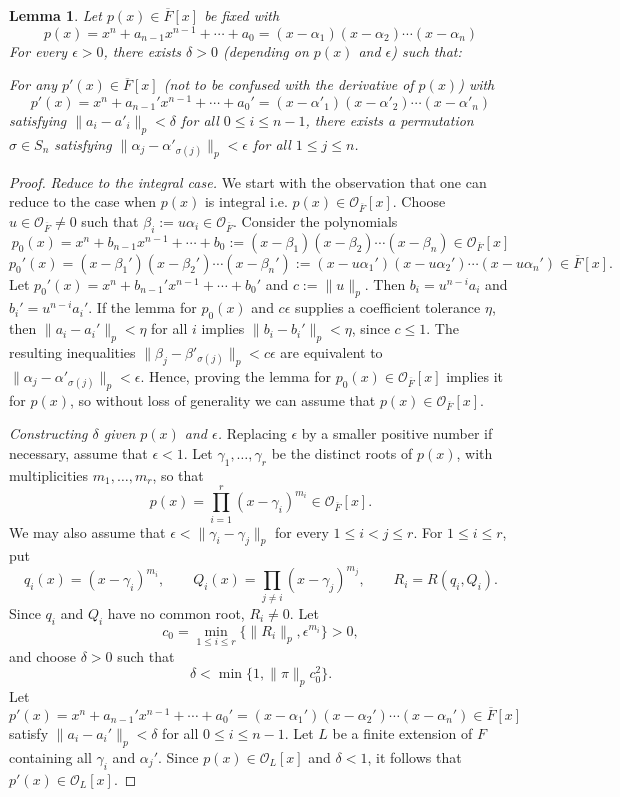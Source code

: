 \documentclass[11pt,a4paper]{article}
\theoremstyle{definition}
\theoremstyle{plain}
\newtheorem{Le}[shared]{Lemma}
\theoremstyle{remark}
\theoremstyle{plain}
\begin{document}
\begin{Le}\label{continuityofroots}
    Let $p(x) \in \overline{F}[x]$ be fixed with $$p(x) = x^n + a_{n-1}x^{n-1} + \cdots + a_0 = (x - \alpha_1)(x - \alpha_2) \cdots (x - \alpha_n)$$ For every $\epsilon > 0$, there exists $\delta > 0$ (depending on $p(x)$ and $\epsilon$) such that: 
    
    For any $p'(x) \in \overline{F}[x]$ (not to be confused with the derivative of $p(x)$) with $$p'(x) = x^n + a_{n-1}'x^{n-1}+ \cdots + a_0' = (x - \alpha'_1)(x - \alpha'_2) \cdots (x - \alpha'_n)$$  satisfying $\| a_i - a'_i \|_p < \delta$ for all $0 \leq  i \leq n-1$, there exists a permutation $\sigma \in S_n$ satisfying $\| \alpha_j - \alpha'_{\sigma(j)} \|_p < \epsilon$ for all $1 \leq j\leq n$.
\end{Le}
\begin{proof}

    \textit{Reduce to the integral case.} We start with the observation that one can reduce to the case when $p(x)$ is integral i.e. $p(x) \in \mathcal{O}_{\overline{F}}[x]$. Choose $u \in \mathcal{O}_{\overline{F}} \neq 0$ such that $\beta_i := u \alpha_i \in \mathcal{O}_{\overline{F}}$. Consider the polynomials $$p_0(x) = x^n + b_{n-1}x^{n-1} + \cdots + b_0 := (x - \beta_1)(x-\beta_2) \cdots (x-\beta_n) \in \mathcal{O}_{\overline{F}}[x]$$  $$p_0'(x) = (x - \beta_1')(x - \beta_2') \cdots (x - \beta_n') := (x - u \alpha_1')(x-u\alpha_2') \cdots (x-u\alpha_n') \in \overline{F}[x].$$
    Let $p_0'(x) = x^n + b_{n-1}' x^{n-1} + \cdots + b_0'$ and $c := \|u \|_p$. Then $b_i = u^{n-i}a_i$ and $b_i'=u^{n-i}a_i'$. If the lemma for $p_0(x)$ and $c\epsilon$ supplies a coefficient tolerance $\eta$, then $\|a_i-a_i'\|_p<\eta$ for all $i$ implies $\|b_i-b_i'\|_p<\eta$, since $c\leq 1$. The resulting inequalities $\|\beta_j-\beta'_{\sigma(j)}\|_p<c\epsilon$ are equivalent to $\|\alpha_j-\alpha'_{\sigma(j)}\|_p<\epsilon$. Hence, proving the lemma for $p_0(x) \in \mathcal{O}_{\overline{F}}[x]$ implies it for $p(x)$, so without loss of generality we can assume that $p(x) \in \mathcal{O}_{\overline{F}}[x]$.
    
    \textit{Constructing $\delta$ given $p(x)$ and $\epsilon$.} Replacing $\epsilon$ by a smaller positive number if necessary, assume that $\epsilon<1$. Let $\gamma_1,\ldots,\gamma_r$ be the distinct roots of $p(x)$, with multiplicities $m_1,\ldots,m_r$, so that $$p(x)=\prod_{i=1}^r(x-\gamma_i)^{m_i}\in\mathcal{O}_{\overline{F}}[x].$$ We may also assume that $\epsilon<\|\gamma_i-\gamma_j\|_p$ for every $1\leq i<j\leq r$. For $1\leq i\leq r$, put
    $$q_i(x)=(x-\gamma_i)^{m_i},\qquad Q_i(x)=\prod_{j\neq i}(x-\gamma_j)^{m_j},\qquad R_i=R(q_i,Q_i).$$
    Since $q_i$ and $Q_i$ have no common root, $R_i\neq0$. Let
    $$c_0=\min_{1\leq i\leq r}\{\|R_i\|_p,\epsilon^{m_i}\}>0,$$
    and choose $\delta>0$ such that
    $$\delta<\min\{1,\|\pi\|_p c_0^2\}.$$
    Let $$p'(x) = x^n + a_{n-1}'x^{n-1} + \cdots + a_0' = (x - \alpha_1')(x-\alpha_2')\cdots (x-\alpha_n') \in \overline{F}[x]$$ satisfy $\| a_i - a_i' \|_p < \delta$ for all $0 \leq i \leq n-1$. Let $L$ be a finite extension of $F$ containing all $\gamma_i$ and $\alpha_j'$. Since $p(x)\in\mathcal{O}_L[x]$ and $\delta<1$, it follows that $p'(x)\in\mathcal{O}_L[x]$.


\end{proof}
\end{document}
